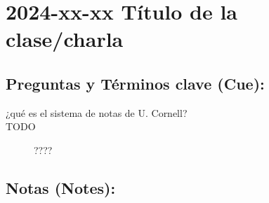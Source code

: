 \documentclass{article}
\begin{document}
\section{2024-xx-xx Título de la clase/charla}
\label{sec:orge654ff3}
\subsection{Preguntas y Términos clave (Cue):}
\label{sec:orgbe30c33}
\begin{description}
\item[{¿qué es el sistema de notas de U. Cornell?}] 

\item[{TODO}] ????
\end{description}
\subsection{Notas (Notes):}
\label{sec:org7de79ba}
\end{document}
